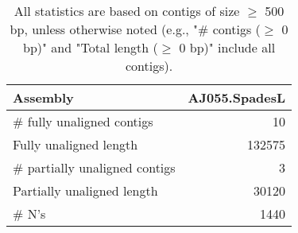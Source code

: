 \documentclass[12pt,a4paper]{article}
\begin{document}
\begin{table}[ht]
\begin{center}
\caption{All statistics are based on contigs of size $\geq$ 500 bp, unless otherwise noted (e.g., "\# contigs ($\geq$ 0 bp)" and "Total length ($\geq$ 0 bp)" include all contigs).}
\begin{tabular}{|l*{1}{|r}|}
\hline
Assembly & AJ055.SpadesL \\ \hline
\# fully unaligned contigs & 10 \\ \hline
Fully unaligned length & 132575 \\ \hline
\# partially unaligned contigs & 3 \\ \hline
Partially unaligned length & 30120 \\ \hline
\# N's & 1440 \\ \hline
\end{tabular}
\end{center}
\end{table}
\end{document}
